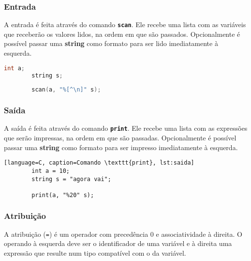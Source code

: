 \subsubsection{Entrada}
A entrada é feita através do comando \texttt{\textbf{scan}}. Ele recebe uma lista com as variáveis que receberão os
valores lidos, na ordem em que são passados. Opcionalmente é possível passar uma \textbf{string} como formato para ser
lido imediatamente à esquerda.

\begin{lstlisting}[language=C, caption=Comando \texttt{scan}, label=lst:entrada]
        int a;
        string s;
        
        scan(a, "%[^\n]" s);
\end{lstlisting}

\subsubsection{Saída}A saída é feita através do comando \texttt{\textbf{print}}.
Ele recebe uma lista com as expressões que serão impressas, na ordem em que são passadas.
Opcionalmente é possível passar uma \textbf{string} como formato para ser impresso imediatamente à esquerda.

\begin{lstlisting}[language=C, caption=Comando \texttt{print}, lst:saida]
        int a = 10;
        string s = "agora vai";
        
        print(a, "%20" s);
\end{lstlisting}

\subsubsection{Atribuição}
A atribuição (\texttt{=}) é um operador com precedência 0 e associatividade à direita. O operando à esquerda deve ser o
identificador de uma variável e à direita uma expressão que resulte num tipo compatível com o da variável.